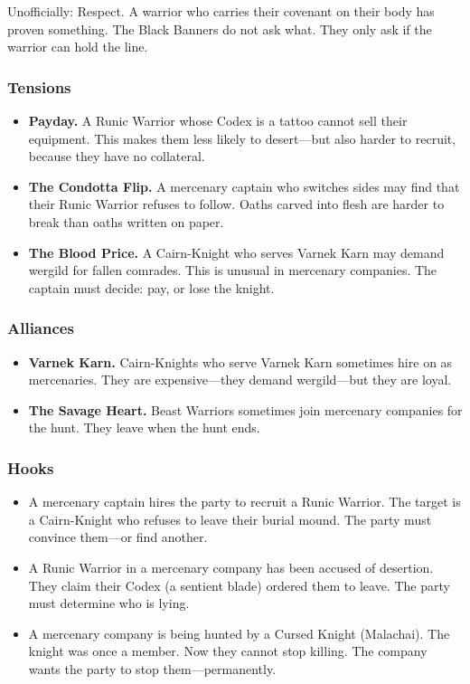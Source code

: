 Unofficially: Respect. A warrior who carries their covenant on their body has proven something. The Black Banners do not ask what. They only ask if the warrior can hold the line.

\subsubsection{Tensions}

\begin{itemize}
\item \textbf{Payday.} A Runic Warrior whose Codex is a tattoo cannot sell their equipment. This makes them less likely to desert—but also harder to recruit, because they have no collateral.
\item \textbf{The Condotta Flip.} A mercenary captain who switches sides may find that their Runic Warrior refuses to follow. Oaths carved into flesh are harder to break than oaths written on paper.
\item \textbf{The Blood Price.} A Cairn-Knight who serves Varnek Karn may demand wergild for fallen comrades. This is unusual in mercenary companies. The captain must decide: pay, or lose the knight.
\end{itemize}

\subsubsection{Alliances}

\begin{itemize}
\item \textbf{Varnek Karn.} Cairn-Knights who serve Varnek Karn sometimes hire on as mercenaries. They are expensive—they demand wergild—but they are loyal.
\item \textbf{The Savage Heart.} Beast Warriors sometimes join mercenary companies for the hunt. They leave when the hunt ends.
\end{itemize}

\subsubsection{Hooks}

\begin{itemize}
\item A mercenary captain hires the party to recruit a Runic Warrior. The target is a Cairn-Knight who refuses to leave their burial mound. The party must convince them—or find another.
\item A Runic Warrior in a mercenary company has been accused of desertion. They claim their Codex (a sentient blade) ordered them to leave. The party must determine who is lying.
\item A mercenary company is being hunted by a Cursed Knight (Malachai). The knight was once a member. Now they cannot stop killing. The company wants the party to stop them—permanently.
\end{itemize}

